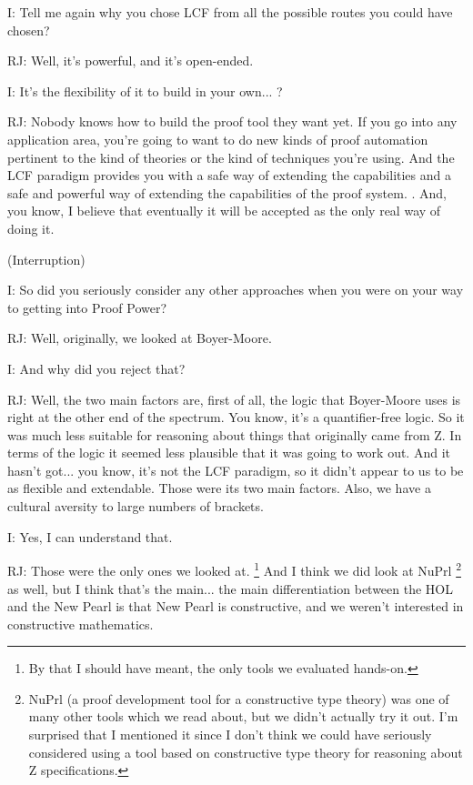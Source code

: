 \documentclass[10pt,titlepage]{book}
\begin{document}
I: Tell me again why you chose LCF from all the possible routes you could have chosen?

RJ: Well, it's powerful, and it's open-ended.

I: It's the flexibility of it to build in your own... ?

RJ: Nobody knows how to build the proof tool they want yet. If you go into any application area, you're going to want to do new kinds of proof automation pertinent to the kind of theories or the kind of techniques you're using. And the LCF paradigm provides you with a safe way of extending the capabilities and a safe and powerful way of extending the capabilities of the proof system. 		. And, you know, I believe that eventually it will be accepted as the only real way of doing it.

(Interruption)

I: So did you seriously consider any other approaches when you were on your way to getting into Proof Power?

RJ: Well, originally, we looked at Boyer-Moore.

I: And why did you reject that?

RJ: Well, the two main factors are, first of all, the logic that Boyer-Moore uses is right at the other end of the spectrum. You know, it's a quantifier-free logic.
So it was much less suitable for reasoning about things that originally came from Z.
In terms of the logic it seemed less plausible that it was going to work out.
And it hasn't got... you know, it's not the LCF paradigm, so it didn't appear to us to be as flexible and extendable.
Those were its two main factors.
Also, we have a cultural aversity to large numbers of brackets.

I: Yes, I can understand that.

RJ: Those were the only ones we looked at.%
\footnote{
By that I should have meant, the only tools we evaluated hands-on.
}%
And I think we did look at NuPrl%
\footnote{
NuPrl (a proof development tool for a constructive type theory) was one of many other tools which we read about, but we didn't actually try it out.
I'm surprised that I mentioned it since I don't think we could have seriously considered using a tool based on constructive type theory for reasoning about Z specifications.
}%
 as well, but I think that's the main... the main differentiation between the HOL and the New Pearl is that New Pearl is constructive, and we weren't interested in constructive mathematics.
\end{document}
